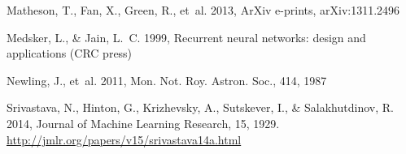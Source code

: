 \documentclass[twocolumn]{aastex61}
\begin{document}
\begin{thebibliography}{}
{Matheson}, T., {Fan}, X., {Green}, R., {et~al.} 2013, ArXiv e-prints,
  arXiv:1311.2496
  
Medsker, L., \& Jain, L.~C. 1999, Recurrent neural networks: design and
  applications (CRC press)

Newling, J., {et~al.} 2011, Mon. Not. Roy. Astron. Soc., 414, 1987

Srivastava, N., Hinton, G., Krizhevsky, A., Sutskever, I., \& Salakhutdinov, R.
  2014, Journal of Machine Learning Research, 15, 1929.
\newblock \url{http://jmlr.org/papers/v15/srivastava14a.html}

\end{thebibliography}
\end{document}
